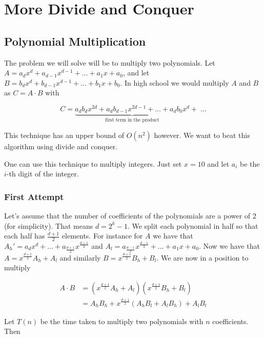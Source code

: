 
\section{More Divide and Conquer}

\subsection{Polynomial Multiplication}

The problem we will solve will be to multiply two polynomials.
Let $A = a_dx^d + a_{d-1}x^{d-1} + ... + a_1x + a_0$, and let
$B = b_dx^d + b_{d-1}x^{d-1} + ... + b_1x + b_0$. In high school we
would multiply $A$ and $B$ as $C = A \cdot B$ with

$$
C = \underbrace{a_db_dx^{2d} + a_db_{d-1}x^{2d-1} + ... + a_db_0x^d}_{
    \text{first term in the product}
} + \; ...
$$

This technique has an upper bound of $O(n^2)$ however. We want to beat
this algorithm using divide and conquer.

\begin{remark}
    One can use this technique to multiply integers. Just set
    $x = 10$ and let $a_i$ be the $i$-th digit of the integer.
\end{remark}

\subsubsection{First Attempt}

Let's assume that the number of coefficients of the polynomials are a
power of 2 (for simplicity). That means $d = 2^k - 1$. We split each
polynomial in half so that each half has 
$\frac{d + 1}{2}$ elements. For instance for $A$ we have that
$A_h' = a_dx^d + ... + a_{\frac{d+1}{2}}x^{\frac{d+1}{2}} $ and
$A_l = a_{\frac{d-1}{2}}x^{\frac{d-1}{2}} + ... + a_1x + a_0$.
Now we have that $A = x^{\frac{d+1}{2}}A_h + A_l$ and similarly
$B = x^{\frac{d+1}{2}}B_h + B_l$. We are now in a position to multiply

\begin{align}
    A \cdot B &= (x^{\frac{d+1}{2}}A_h + A_l) (x^{\frac{d+1}{2}}B_h +
    B_l) \\
    &= A_hB_h + x^{\frac{d+1}{2}}(A_hB_l + A_lB_h) + A_lB_l
\end{align}

Let $T(n)$ be the time taken to multiply two polynomials with $n$
coefficients. Then

